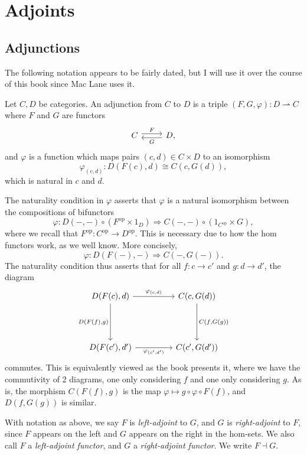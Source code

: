 \chapter{Adjoints}

\section{Adjunctions}
The following notation appears to be fairly dated, but I will use it over the course of this book since Mac Lane uses it.
\begin{definition}[Adjunction]\label{dfn:4.1}
	Let $C,D$ be categories. An adjunction from $C$ to $D$ is a triple $(F,G,\varphi ) : D \rightharpoonup C$ where $F$ and $G$ are functors
	\[\begin{tikzcd}[row sep = 2.5em, column sep = 2.5em]
	C\ar[" F ", shift left, r] & D\ar[" G ", shift left, l],
	\end{tikzcd}\]
	and $\varphi $ is a function which maps pairs $(c,d)\in C\times D$ to an isomorphism
	\[
		\varphi_{(c,d)} : D(F(c),d)\cong C(c,G(d))
	,\]
	which is natural in $c$ and $d$.
\end{definition}

The naturality condition in $\varphi $ asserts that $\varphi $ is a natural isomorphism between the compositions of bifunctors
\[
	\varphi : D(-,-)\circ (F^{\mathrm{op} }\times 1_D) \Rightarrow C(-,-)\circ (1_{C^{\mathrm{op} } }\times G)
,\]
where we recall that $F^{\mathrm{op} } : C^{\mathrm{op} }  \to D^{\mathrm{op} } $. This is necessary due to how the hom functors work, as we well know. More concisely,
\[
	\varphi : D(F(-),-) \Rightarrow C(-,G(-))
.\]
The naturality condition thus asserts that for all $f : c \to c'$ and $g : d \to d'$, the diagram
\[\begin{tikzcd}[row sep = 4.5em, column sep = 4.5em]
D(F(c),d)\ar[" \varphi_{(c\text{,} d)}  ", r] \ar[" D(F(f)\text{,}g) "', d]  & C(c,G(d))\ar[" C(f\text{,} G(g)) ", d]  \\
D(F(c'),d')\ar[" \varphi_{(c'\text{,} d')}  "', r]  & C(c',G(d'))
\end{tikzcd}\]
commutes. This is equivalently viewed as the book presents it, where we have the commutivity of 2 diagrams, one only considering $f$ and one only considering $g$. As is, the morphism $C(F(f),g)$ is the map $\varphi \mapsto g\circ \varphi \circ F(f)$, and $D(f,G(g))$ is similar.

With notation as above, we say $F$ is \emph{left-adjoint} to $G$, and $G$ is \emph{right-adjoint} to $F$, since $F$ appears on the left and $G$ appears on the right in the hom-sets. We also call $F$ a \emph{left-adjoint functor}, and $G$ a \emph{right-adjoint functor}. We write $F\dashv G$.

